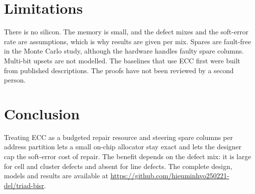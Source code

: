 \documentclass[conference]{IEEEtran}
\begin{document}
\section{Limitations}
There is no silicon. The memory is small, and the defect mixes and the soft-error rate are
assumptions, which is why results are given per mix. Spares are fault-free in the Monte Carlo study,
although the hardware handles faulty spare columns. Multi-bit upsets are not modelled. The baselines
that use ECC first were built from published descriptions. The proofs have not been reviewed by a
second person.

\section{Conclusion}
Treating ECC as a budgeted repair resource and steering spare columns per address partition lets a
small on-chip allocator stay exact and lets the designer cap the soft-error cost of repair. The
benefit depends on the defect mix: it is large for cell and cluster defects and absent for line
defects. The complete design, models and results are available at
\url{https://github.com/hieuminhvo250221-del/triad-bisr}.



\end{document}
